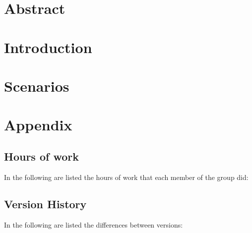 \documentclass{../Common/Structure/doc_pdf}
\begin{document}
\titleToc

\chapter{Abstract}
\chapter{Introduction}
\chapter{Scenarios}





\appendix
\chapter{Appendix}

\section{Hours of work}
In the following are listed the hours of work that each member of the group did:
\newpage
\section{Version History}
In the following are listed the differences between versions:
\end{document}
